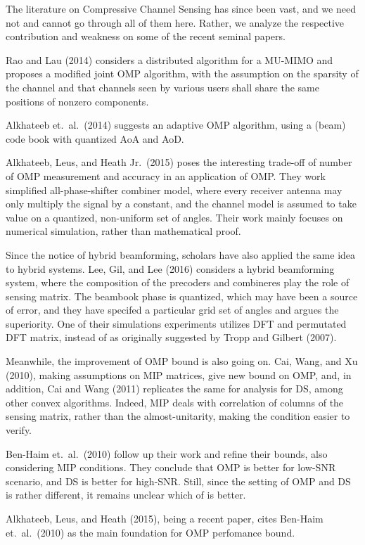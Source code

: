 The literature on Compressive Channel Sensing has since been vast, and we need not and cannot go through all of them here.
Rather, we analyze the respective contribution and weakness on some of the recent seminal papers.

Rao and Lau (2014) considers a distributed algorithm for a MU-MIMO and proposes a modified joint OMP algorithm, with the assumption on the sparsity of the channel and that channels seen by various users shall share the same positions of nonzero components.

Alkhateeb et.\ al.\ (2014) suggests an adaptive OMP algorithm, using a (beam) code book with quantized AoA and AoD.

Alkhateeb, Leus, and Heath Jr.\ (2015) poses the interesting trade-off of number of OMP measurement and accuracy in an application of OMP.
They work simplified all-phase-shifter combiner model, where every receiver antenna may only multiply the signal by a constant, and the channel model is assumed to take value on a quantized, non-uniform set of angles.
Their work mainly focuses on numerical simulation, rather than mathematical proof.

Since the notice of hybrid beamforming, scholars have also applied the same idea to hybrid systems.
Lee, Gil, and Lee (2016) considers a hybrid beamforming system, where the composition of the precoders and combineres play the role of sensing matrix.
The beambook phase is quantized, which may have been a source of error, and they have specifed a particular grid set of angles and argues the superiority.
One of their simulations experiments utilizes DFT and permutated DFT matrix, instead of as originally suggested by Tropp and Gilbert (2007).

Meanwhile, the improvement of OMP bound is also going on.
Cai, Wang, and Xu (2010), making assumptions on MIP matrices, give new bound on OMP, and, in addition, Cai and Wang (2011) replicates the same for analysis for DS, among other convex algorithms.
Indeed, MIP deals with correlation of columns of the sensing matrix, rather than the almost-unitarity, making the condition easier to verify.

Ben-Haim et.\ al.\ (2010) follow up their work and refine their bounds, also considering MIP conditions.
They conclude that OMP is better for low-SNR scenario, and DS is better for high-SNR.
Still, since the setting of OMP and DS is rather different, it remains unclear which of is better.

Alkhateeb, Leus, and Heath (2015), being a recent paper, cites Ben-Haim et.\ al.\ (2010) as the main foundation for OMP perfomance bound.

